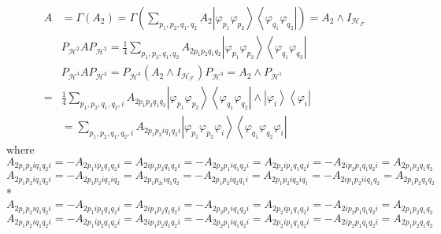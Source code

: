 \documentclass[aps,preprint]{revtex4}%
\begin{document}
\begin{align}
A &  =\Gamma\left(  A_{2}\right)  =\Gamma\left(  \sum_{p_{1},p_{2},q_{1}%
,q_{2}}A_{2}\left\vert \varphi_{p_{1}}\varphi_{p_{2}}\right\rangle
\left\langle \varphi_{q_{1}}\varphi_{q_{2}}\right\vert \right)  =A_{2}\wedge
I_{\mathcal{H}_{\mathcal{F}}}\\
&  P_{\mathcal{H}^{2}}AP_{\mathcal{H}^{2}}=\frac{1}{4}\sum_{p_{1},p_{2}%
,q_{1},q_{2}}A_{2p_{1}p_{2}q_{1}q_{2}}\left\vert \varphi_{p_{1}}\varphi
_{p_{2}}\right\rangle \left\langle \varphi_{q_{1}}\varphi_{q_{2}}\right\vert
\\
&  P_{\mathcal{H}^{3}}AP_{\mathcal{H}^{3}}=P_{\mathcal{H}^{3}}\left(
A_{2}\wedge I_{\mathcal{H}_{\mathcal{F}}}\right)  P_{\mathcal{H}^{3}}%
=A_{2}\wedge P_{\mathcal{H}^{1}}\\
= &  \frac{1}{4}\sum_{p_{1},p_{2},q_{1},q_{2},i}A_{2p_{1}p_{2}q_{1}q_{2}%
}\left\vert \varphi_{p_{1}}\varphi_{p_{2}}\right\rangle \left\langle
\varphi_{q_{1}}\varphi_{q_{2}}\right\vert \wedge\left\vert \varphi
_{i}\right\rangle \left\langle \varphi_{i}\right\vert \\
&  =\sum_{p_{1},p_{2},q_{1},q_{2},i}A_{2p_{1}p_{2}iq_{1}q_{2}i}\left\vert
\varphi_{p_{1}}\varphi_{p_{2}}\varphi_{i}\right\rangle \left\langle
\varphi_{q_{1}}\varphi_{q_{2}}\varphi_{i}\right\vert
\end{align}
where
\begin{equation}
A_{2p_{1}p_{2}iq_{1}q_{2}i}=-A_{2p_{1}ip_{2}q_{1}q_{2}i}=A_{2ip_{1}p_{2}%
q_{1}q_{2}i}=-A_{2p_{2}p_{1}iq_{1}q_{2}i}=A_{2p_{2}ip_{1}q_{1}q_{2}%
i}=-A_{2ip_{2}p_{1}q_{1}q_{2}i}=A_{2p_{1}p_{2}q_{1}q_{2}}%
\end{equation}%
\begin{equation}
A_{2p_{1}p_{2}iq_{1}q_{2}i}=-A_{2p_{1}p_{2}iq_{1}iq_{2}}=A_{2p_{1}p_{2i}%
iq_{1}q_{2}}=-A_{2p_{1}p_{2}iq_{2}q_{1}i}=A_{2p_{1}p_{2}iq_{2}iq_{1}%
}=-A_{2ip_{1}p_{2}iiq_{1}q_{2}}=A_{2p_{1}p_{2}q_{1}q_{2}}%
\end{equation}
*%
\begin{equation}
A_{2p_{1}p_{2}iq_{1}q_{2}i}=-A_{2p_{1}ip_{2}q_{1}q_{2}i}=A_{2ip_{1}p_{2}%
q_{1}q_{2}i}=-A_{2p_{2}p_{1}iq_{1}q_{2}i}=A_{2p_{2}ip_{1}q_{1}q_{2}%
i}=-A_{2ip_{2}p_{1}q_{1}q_{2}i}=A_{2p_{1}p_{2}q_{1}q_{2}}%
\end{equation}%
\begin{equation}
A_{2p_{1}p_{2}iq_{1}q_{2}i}=-A_{2p_{1}ip_{2}q_{1}q_{2}i}=A_{2ip_{1}p_{2}%
q_{1}q_{2}i}=-A_{2p_{2}p_{1}iq_{1}q_{2}i}=A_{2p_{2}ip_{1}q_{1}q_{2}%
i}=-A_{2ip_{2}p_{1}q_{1}q_{2}i}=A_{2p_{1}p_{2}q_{1}q_{2}}%
\end{equation}%
\end{document}
